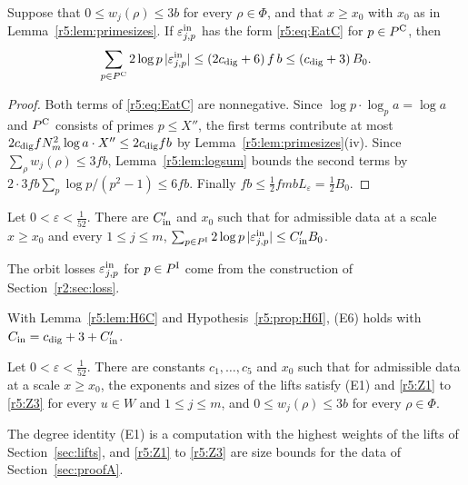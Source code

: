 \begin{lemma}\label{r5:lem:H6C}
Suppose that $0\le w_j(\rho)\le3b$ for every $\rho\in\Phi$, and that $x\ge x_0$ with $x_0$ as in Lemma~\ref{r5:lem:primesizes}. If $\varepsilon^{\rm in}_{j,p}$ has the form \eqref{r5:eq:EatC} for $p\in P^{\rm C}$, then
\[
\sum_{p\in P^{\rm C}}2\log p\,\lvert\varepsilon^{\rm in}_{j,p}\rvert\le(2c_{\rm dig}+6)\,f\,b\le(c_{\rm dig}+3)\,B_0 .
\]
\end{lemma}

\begin{proof}
Both terms of \eqref{r5:eq:EatC} are nonnegative. Since $\log p\cdot\log_pa=\log a$ and $P^{\rm C}$ consists of primes $p\le X''$, the first terms contribute at most $2c_{\rm dig}fN_m^2\log a\cdot X''\le2c_{\rm dig}fb$ by Lemma~\ref{r5:lem:primesizes}(iv). Since $\sum_\rho w_j(\rho)\le3fb$, Lemma~\ref{r5:lem:logsum} bounds the second terms by $2\cdot3fb\sum_p\log p/(p^2-1)\le6fb$. Finally $fb\le\frac12fmbL_\varepsilon=\frac12B_0$.
\end{proof}

\begin{hypothesis}\label{r5:prop:H6I}
Let $0<\varepsilon<\frac1{52}$. There are $C'_{\rm in}$ and $x_0$ such that for admissible data at a scale $x\ge x_0$ and every $1\le j\le m$, $\sum_{p\in P^{\rm I}}2\log p\,\lvert\varepsilon^{\rm in}_{j,p}\rvert\le C'_{\rm in}B_0$.
\end{hypothesis}

The orbit losses $\varepsilon^{\rm in}_{j,p}$ for $p\in P^{\rm I}$ come from the construction of Section~\ref{r2:sec:loss}. 

With Lemma~\ref{r5:lem:H6C} and Hypothesis~\ref{r5:prop:H6I}, (E6) holds with $C_{\rm in}=c_{\rm dig}+3+C'_{\rm in}$.

\begin{hypothesis}\label{r5:prop:H1}
Let $0<\varepsilon<\frac1{52}$. There are constants $c_1,\dots,c_5$ and $x_0$ such that for admissible data at a scale $x\ge x_0$, the exponents and sizes of the lifts satisfy (E1) and \eqref{r5:Z1} to \eqref{r5:Z3} for every $u\in W$ and $1\le j\le m$, and $0\le w_j(\rho)\le3b$ for every $\rho\in\Phi$.
\end{hypothesis}

The degree identity (E1) is a computation with the highest weights of the lifts of Section~\ref{sec:lifts}, and \eqref{r5:Z1} to \eqref{r5:Z3} are size bounds for the data of Section~\ref{sec:proofA}. 

